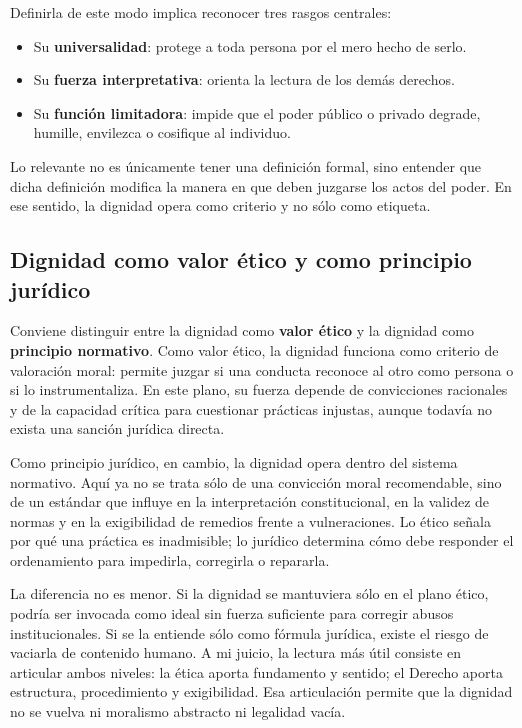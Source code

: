 \documentclass[
	spanish,
	letterpaper, oneside
]{article}
\begin{document}
Definirla de este modo implica reconocer tres rasgos centrales:

\begin{itemize}
  \item Su \textbf{universalidad}: protege a toda persona por el mero hecho de serlo.
  \item Su \textbf{fuerza interpretativa}: orienta la lectura de los demás derechos.
  \item Su \textbf{función limitadora}: impide que el poder público o privado degrade, humille, envilezca o cosifique al individuo.
\end{itemize}
 Lo relevante no es únicamente tener una definición formal, sino entender que dicha definición modifica la manera en que deben juzgarse los actos del poder. En ese sentido, la dignidad opera como criterio y no sólo como etiqueta.
\subsection{Dignidad como valor ético y como principio jurídico}

Conviene distinguir entre la dignidad como \textbf{valor ético} y la dignidad como \textbf{principio normativo}. Como valor ético, la dignidad funciona como criterio de valoración moral: permite juzgar si una conducta reconoce al otro como persona o si lo instrumentaliza. En este plano, su fuerza depende de convicciones racionales y de la capacidad crítica para cuestionar prácticas injustas, aunque todavía no exista una sanción jurídica directa.

Como principio jurídico, en cambio, la dignidad opera dentro del sistema normativo. Aquí ya no se trata sólo de una convicción moral recomendable, sino de un estándar que influye en la interpretación constitucional, en la validez de normas y en la exigibilidad de remedios frente a vulneraciones. Lo ético señala por qué una práctica es inadmisible; lo jurídico determina cómo debe responder el ordenamiento para impedirla, corregirla o repararla.

La diferencia no es menor. Si la dignidad se mantuviera sólo en el plano ético, podría ser invocada como ideal sin fuerza suficiente para corregir abusos institucionales. Si se la entiende sólo como fórmula jurídica, existe el riesgo de vaciarla de contenido humano. A mi juicio, la lectura más útil consiste en articular ambos niveles: la ética aporta fundamento y sentido; el Derecho aporta estructura, procedimiento y exigibilidad. Esa articulación permite que la dignidad no se vuelva ni moralismo abstracto ni legalidad vacía.
\end{document}
